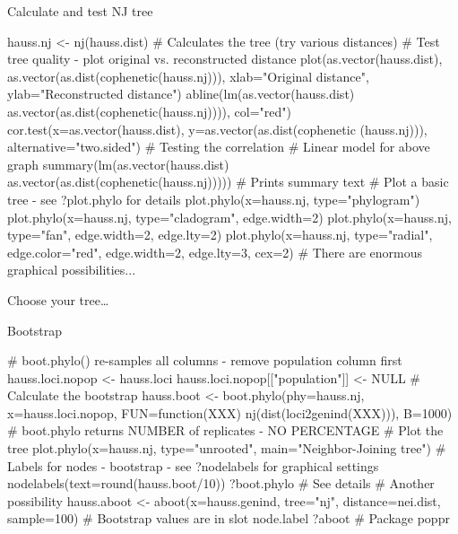 \documentclass[compress, ucs, xelatex, 11pt, xcolor=svgnames, aspectratio=169,
	hyperref={
		bookmarks=true,
		unicode=true,
		colorlinks=true,
		pdftitle={Molecular data in R},
		plainpages=false,
		pdfauthor={Vojtech Zeisek},
		pdfsubject={Course about phylogeny and evolution in R},
		pdfcreator={XeLaTeX},
		pdfkeywords={R, evolution, phylogeny, molecular data},
		linkcolor=Crimson, %
		anchorcolor=Magenta, %
		citecolor=Magenta, %
		filecolor=Magenta, %
		menucolor=Magenta, %
		urlcolor=DodgerBlue, %
		pdftex},
	url={hyphens, lowtilde} %
	]{beamer}
\renewcommand{\texttt}[1]{\colorbox{Beige}{{\ttfamily #1}}}
\begin{document}
\begin{frame}[fragile]{Calculate and test NJ tree}
	\label{NJ}
	\begin{spluscode}
    hauss.nj <- nj(hauss.dist) # Calculates the tree (try various distances)
    # Test tree quality - plot original vs. reconstructed distance
    plot(as.vector(hauss.dist), as.vector(as.dist(cophenetic(hauss.nj))),
      xlab="Original distance", ylab="Reconstructed distance")
    abline(lm(as.vector(hauss.dist) ~
      as.vector(as.dist(cophenetic(hauss.nj)))), col="red")
    cor.test(x=as.vector(hauss.dist), y=as.vector(as.dist(cophenetic
      (hauss.nj))), alternative="two.sided") # Testing the correlation
    # Linear model for above graph
    summary(lm(as.vector(hauss.dist) ~
      as.vector(as.dist(cophenetic(hauss.nj))))) # Prints summary text
    # Plot a basic tree - see ?plot.phylo for details
    plot.phylo(x=hauss.nj, type="phylogram")
    plot.phylo(x=hauss.nj, type="cladogram", edge.width=2)
    plot.phylo(x=hauss.nj, type="fan", edge.width=2, edge.lty=2)
    plot.phylo(x=hauss.nj, type="radial", edge.color="red", edge.width=2,
      edge.lty=3, cex=2) # There are enormous graphical possibilities...
	\end{spluscode}
\end{frame}

\begin{frame}{Choose your tree\ldots}
	\begin{center}
		\texttt{[image: nj1.png]}
	\end{center}
\end{frame}

\begin{frame}[fragile]{Bootstrap}
	\begin{spluscode}
    # boot.phylo() re-samples all columns - remove population column first
    hauss.loci.nopop <- hauss.loci
    hauss.loci.nopop[["population"]] <- NULL
    # Calculate the bootstrap
    hauss.boot <- boot.phylo(phy=hauss.nj, x=hauss.loci.nopop,
      FUN=function(XXX) nj(dist(loci2genind(XXX))), B=1000)
    # boot.phylo returns NUMBER of replicates - NO PERCENTAGE
    # Plot the tree
    plot.phylo(x=hauss.nj, type="unrooted", main="Neighbor-Joining tree")
    # Labels for nodes - bootstrap - see ?nodelabels for graphical settings
    nodelabels(text=round(hauss.boot/10))
    ?boot.phylo # See details
    # Another possibility
    hauss.aboot <- aboot(x=hauss.genind, tree="nj", distance=nei.dist,
      sample=100) # Bootstrap values are in slot node.label
    ?aboot # Package poppr
	\end{spluscode}
\end{frame}
\end{document}
